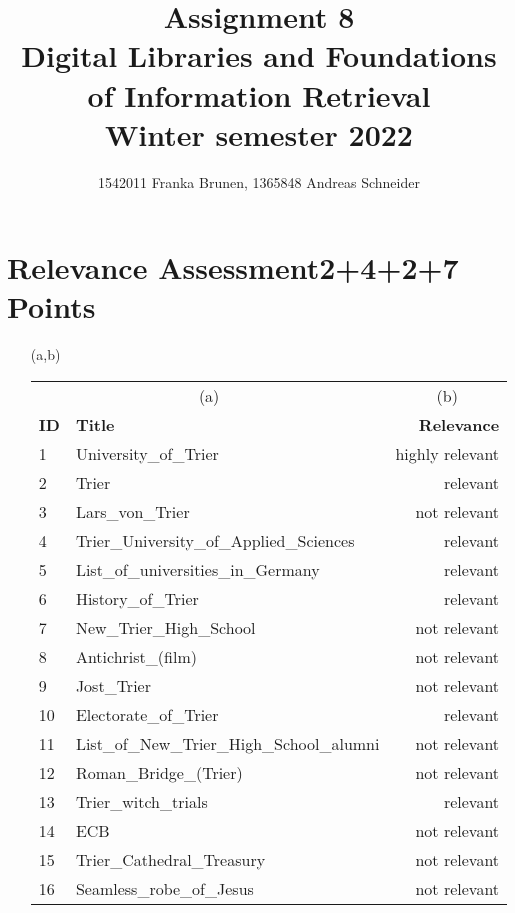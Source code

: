 \documentclass[10pt,a4paper]{article}
\title{ \vspace{-3em}
        Assignment 8\\
		\small{\bf Digital Libraries and Foundations of Information Retrieval}\\
		\small{Winter semester 2022}}
\author{\small{1542011 Franka Brunen}, \small{1365848 Andreas Schneider}}
\date{}
\begin{document}
\setlength{\parskip}{6pt} %
\setlength{\parindent}{0pt}

\leftskip=1cm\rightskip=0.5cm %

\maketitle

\section{\hfill Relevance Assessment\hfill 2+4+2+7 Points}
\begin{enumerate}
    \item[(a,b)] \begin{tabular}[t]{llr}
        \multicolumn{2}{c}{(a)} & \multicolumn{1}{c}{(b)}          \\
        \textbf{ID} & \textbf{Title}            & \textbf{Relevance}  \\
        1	& University\_of\_Trier	& highly relevant\\
        2	& Trier	& relevant\\
        3	& Lars\_von\_Trier	& not relevant\\
        4	& Trier\_University\_of\_Applied\_Sciences	& relevant\\
        5	& List\_of\_universities\_in\_Germany	& relevant\\
        6	& History\_of\_Trier	& relevant\\
        7	& New\_Trier\_High\_School	& not relevant\\
        8	& Antichrist\_(film)	& not relevant\\
        9	& Jost\_Trier	& not relevant\\
        10	& Electorate\_of\_Trier	& relevant\\
        11	& List\_of\_New\_Trier\_High\_School\_alumni	& not relevant\\
        12	& Roman\_Bridge\_(Trier)	& not relevant\\
        13	& Trier\_witch\_trials	& relevant\\
        14	& ECB	& not relevant\\
        15	& Trier\_Cathedral\_Treasury	& not relevant\\
        16	& Seamless\_robe\_of\_Jesus	& not relevant\\

\end{tabular}
\end{enumerate}
\end{document}
